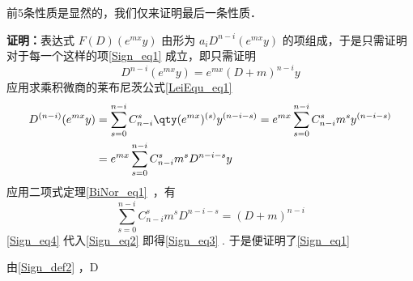 前5条性质是显然的，我们仅来证明最后一条性质．

\textbf{证明：}表达式 $F(D)(e^{mx}y)$ 由形为 $a_{i}D^{n-i}(e^{mx}y)$ 的项组成，于是只需证明对于每一个这样的项\autoref{Sign_eq1} 成立，即只需证明
\begin{equation}\label{Sign_eq3}
D^{n-i}(e^{mx}y)=e^{mx}(D+m)^{n-i}y
\end{equation}
应用求乘积微商的莱布尼茨公式\autoref{LeiEqu_eq1}~
\begin{equation}\label{Sign_eq2}
\begin{aligned}
D^{(n-i)}(e^{mx}y)&=\sum_{s=0}^{n-i}C_{n-i}^s\qty(e^{mx})^{(s)}y^{(n-i-s)}=e^{mx}\sum_{s=0}^{n-i}C_{n-i}^sm^sy^{(n-i-s)}\\
&=e^{mx}\sum_{s=0}^{n-i}C_{n-i}^sm^sD^{n-i-s}y
\end{aligned}
\end{equation}
应用二项式定理\autoref{BiNor_eq1}~，有
\begin{equation}\label{Sign_eq4}
\sum_{s=0}^{n-i}C_{n-i}^sm^sD^{n-i-s}=(D+m)^{n-i}
\end{equation}
\autoref{Sign_eq4}  代入\autoref{Sign_eq2} 即得\autoref{Sign_eq3} . 于是便证明了\autoref{Sign_eq1} 

\begin{example}{}

\end{example}
由\autoref{Sign_def2} ，D

